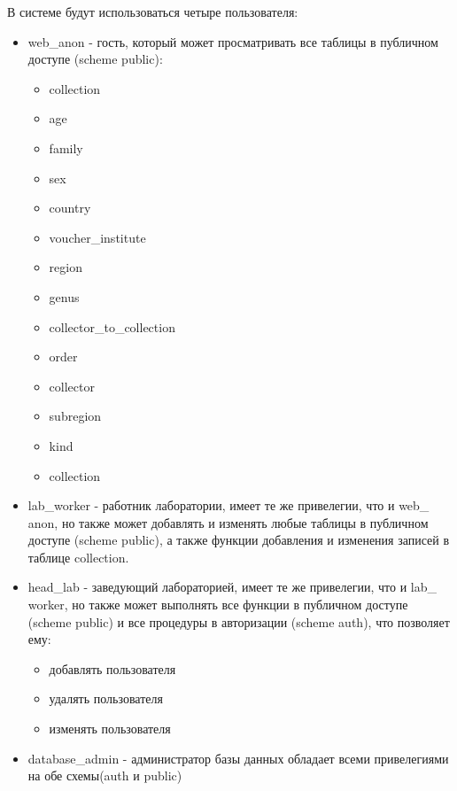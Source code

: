 \documentclass[14pt]{extarticle}
\date{\today}
\title{}
\begin{document}
В системе будут использоваться четыре пользователя:
\begin{itemize}
\item web\_​anon - гость, который может просматривать все таблицы в публичном доступе (scheme public):

\begin{itemize}
\item collection

\item age

\item family

\item sex

\item country

\item voucher\_​institute

\item region

\item genus

\item collector\_​to\_​collection

\item order

\item collector

\item subregion

\item kind

\item collection
\end{itemize}

\item lab\_​worker - работник лаборатории, имеет те же привелегии, что и web\_​anon,
но также может добавлять и изменять любые таблицы в публичном доступе (scheme public), а также функции добавления и изменения записей в таблице collection.

\item head\_​lab - заведующий лабораторией, имеет те же привелегии, что и lab\_​worker,
но также может выполнять все функции в публичном доступе (scheme public) и
все процедуры в авторизации (scheme auth), что позволяет ему:

\begin{itemize}
\item добавлять пользователя

\item удалять пользователя

\item изменять пользователя
\end{itemize}

\item database\_​admin - администратор базы данных обладает всеми привелегиями на обе схемы(auth и public)
\end{itemize}
\end{document}
